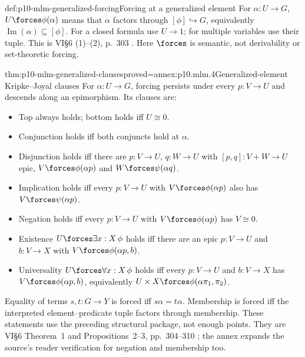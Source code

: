 \begin{hbdefinition}{def:p10-mlm-generalized-forcing}{Forcing at a generalized element}
For \(\alpha:U\to G\), \(U\forces\phi(\alpha)\) means that \(\alpha\) factors
through \([\phi]\hookrightarrow G\), equivalently
\(\operatorname{Im}(\alpha)\subseteq[\phi]\).
For a closed formula use \(U\to1\); for multiple variables use their tuple.
This is VI\S6 (1)--(2), p.~303 \cite{MacLaneMoerdijk1992}.
Here \(\forces\) is semantic, not derivability or set-theoretic forcing.
\end{hbdefinition}

\begin{hbtheorem}{thm:p10-mlm-generalized-clauses}{proved=annex:p10.mlm.4}{Generalized-element Kripke--Joyal clauses}
For \(\alpha:U\to G\), forcing persists under every \(p:V\to U\) and
descends along an epimorphism. Its clauses are:
\begin{itemize}
\item Top always holds; bottom holds iff \(U\cong0\).
\item Conjunction holds iff both conjuncts hold at \(\alpha\).
\item Disjunction holds iff there are \(p:V\to U\), \(q:W\to U\) with
      \([p,q]:V+W\to U\) epic, \(V\forces\phi(\alpha p)\) and
      \(W\forces\psi(\alpha q)\).
\item Implication holds iff every \(p:V\to U\) with
      \(V\forces\phi(\alpha p)\) also has \(V\forces\psi(\alpha p)\).
\item Negation holds iff every \(p:V\to U\) with
      \(V\forces\phi(\alpha p)\) has \(V\cong0\).
\item Existence \(U\forces\exists x:X\,\phi\) holds iff there are an epic
      \(p:V\to U\) and \(b:V\to X\) with \(V\forces\phi(\alpha p,b)\).
\item Universality \(U\forces\forall x:X\,\phi\) holds iff every \(p:V\to U\)
      and \(b:V\to X\) has \(V\forces\phi(\alpha p,b)\), equivalently
      \(U\times X\forces\phi(\alpha\pi_1,\pi_2)\).
\end{itemize}
Equality of terms \(s,t:G\to Y\) is forced iff \(s\alpha=t\alpha\).
Membership is forced iff the interpreted element--predicate tuple factors
through membership. These statements use the preceding structural package,
not enough points. They are VI\S6 Theorem~1 and Propositions~2--3,
pp.~304--310 \cite{MacLaneMoerdijk1992}; the annex expands the source's reader
verification for negation and membership too.
\end{hbtheorem}

